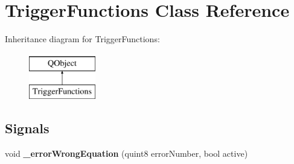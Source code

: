 \hypertarget{class_trigger_functions}{}\section{Trigger\+Functions Class Reference}
\label{class_trigger_functions}
Inheritance diagram for Trigger\+Functions\+:\begin{figure}[H]
\begin{center}
\leavevmode
\includegraphics[height=2.000000cm]{class_trigger_functions}
\end{center}
\end{figure}
\subsection*{Signals}
\begin{DoxyCompactItemize}
\item 
\mbox{\label{class_trigger_functions_a0a7469017e5ea365006383adbd4ab8a0}} 
void {\bfseries \+\_\+error\+Wrong\+Equation} (quint8 error\+Number, bool active)
\end{DoxyCompactItemize}
